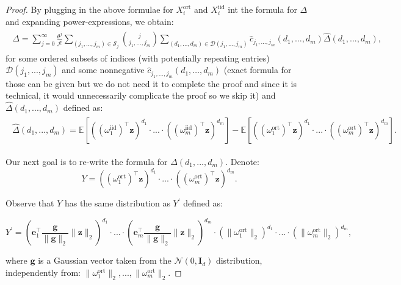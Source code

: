 \begin{proof}
By plugging in the above formulae for $X_{i}^{\mathrm{ort}}$ and $X_{i}^{\mathrm{iid}}$ int the formula for $\Delta$ and expanding power-expressions, we obtain:
\begin{align}
\begin{split}
\Delta = \sum_{j=0}^{\infty} \frac{\theta^{j}}{j!} \sum_{(j_{1},...,j_{m}) \in \mathcal{S}_{j}} \binom{j}{j_{1},\dots,j_{m}} \sum_{(d_{1},...,d_{m}) \in \mathcal{D}(j_{1},...,j_{m})} \widehat{c}_{j_1, \dots, j_m}(d_{1},\dots,d_{m}) \widehat{\Delta}(d_{1},...,d_{m}),
\end{split}    
\end{align}
for some ordered subsets of indices (with potentially repeating entries) $\mathcal{D}(j_{1},...,j_{m})$ and some nonnegative $\widehat{c}_{j_1, \dots, j_m}(d_{1},\dots,d_{m})$ (exact formula for those can be given but we do not need it to complete the proof and since it is technical, it would unnecessarily complicate the proof so we skip it)
and $\widehat{\Delta}(d_{1},...,d_{m})$ defined as:
\begin{align}
\begin{split}
\label{imp-ineq}
\widehat{\Delta}(d_{1},...,d_{m}) = \mathbb{E}[((\omega_{1}^{\mathrm{iid}})^{\top}\mathbf{z})^{d_{1}} \cdot ... \cdot ((\omega_{m}^{\mathrm{iid}})^{\top}\mathbf{z})^{d_{m}}] - 
\mathbb{E}[((\omega_{1}^{\mathrm{ort}})^{\top}\mathbf{z})^{d_{1}} \cdot ... \cdot ((\omega_{m}^{\mathrm{ort}})^{\top}\mathbf{z})^{d_{m}}].
\end{split}
\end{align}

Our next goal is to re-write the formula for $\widehat{\Delta}(d_{1},...,d_{m})$. Denote:
\begin{equation}
Y = ((\omega_{1}^{\mathrm{ort}})^{\top}\mathbf{z})^{d_{1}} \cdot ... \cdot ((\omega_{m}^{\mathrm{ort}})^{\top}\mathbf{z})^{d_{m}}.    
\end{equation}

Observe that $Y$ has the same distribution as $Y^{\prime}$ defined as:

\begin{equation}
Y^{\prime} = (\mathbf{e}_{1}^{\top}\frac{\mathbf{g}}{\|\mathbf{g}\|_{2}}\|\mathbf{z}\|_{2})^{d_{1}} \cdot ... \cdot (\mathbf{e}_{m}^{\top}\frac{\mathbf{g}}{\|\mathbf{g}\|_{2}}\|\mathbf{z}\|_{2})^{d_{m}} \cdot
(\|\omega_{1}^{\mathrm{ort}}\|_{2})^{d_{1}} \cdot ... \cdot
(\|\omega_{m}^{\mathrm{ort}}\|_{2})^{d_{m}},
\end{equation}

where $\mathbf{g}$ is a Gaussian vector taken from the $\mathcal{N}(0,\mathbf{I}_{d})$ distribution, independently from: $\|\omega_{1}^{\mathrm{ort}}\|_{2},...,\|\omega_{m}^{\mathrm{ort}}\|_{2}$. 


\end{proof}

